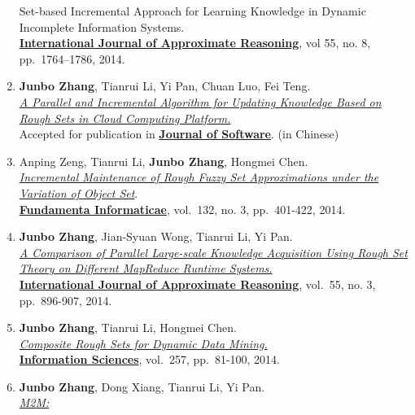 \documentclass[]{article}
\begin{document}
\begin{enumerate}
{{  Set-based Incremental Approach for Learning Knowledge in Dynamic
  Incomplete Information Systems.}}\\
  \href{http://www.journals.elsevier.com/international-journal-of-approximate-reasoning}{\textbf{International
  Journal of Approximate Reasoning}}, vol 55, no. 8, pp.~1764--1786,
  2014.
\item
  \textbf{Junbo Zhang}, Tianrui Li, Yi Pan, Chuan Luo, Fei Teng.\\
  \href{http://dx.doi.org/10.13328/j.cnki.jos.004590}{\emph{A Parallel
  and Incremental Algorithm for Updating Knowledge Based on Rough Sets
  in Cloud Computing Platform.}}\\ Accepted for publication in
  \href{http://www.jos.org.cn/ch/index.aspx}{\textbf{Journal of
  Software}}. (in Chinese)
\item
  Anping Zeng, Tianrui Li, \textbf{Junbo Zhang}, Hongmei Chen.\\
  \href{http://dx.doi.org/10.3233/FI-2014-1051}{\emph{Incremental
  Maintenance of Rough Fuzzy Set Approximations under the Variation of
  Object Set}}.\\
  \href{http://www.iospress.nl/journal/fundamenta-informaticae}{\textbf{Fundamenta
  Informaticae}}, vol.~132, no. 3, pp.~401-422, 2014.
\item
  \textbf{Junbo Zhang}, Jian-Syuan Wong, Tianrui Li, Yi Pan.\\
  \href{http://dx.doi.org/10.1016/j.ijar.2013.08.003}{\emph{A Comparison
  of Parallel Large-scale Knowledge Acquisition Using Rough Set Theory
  on Different MapReduce Runtime Systems.}}\\
  \href{http://www.journals.elsevier.com/international-journal-of-approximate-reasoning}{\textbf{International
  Journal of Approximate Reasoning}}, vol.~55, no. 3, pp.~896-907, 2014.
\item
  \textbf{Junbo Zhang}, Tianrui Li, Hongmei Chen.\\
  \href{http://dx.doi.org/10.1016/j.ins.2013.08.016}{\emph{Composite
  Rough Sets for Dynamic Data Mining.}}\\
  \href{http://www.journals.elsevier.com/information-sciences}{\textbf{Information
  Sciences}}, vol.~257, pp.~81-100, 2014.
\item
  \textbf{Junbo Zhang}, Dong Xiang, Tianrui Li, Yi Pan.\\
  \href{http://ieeexplore.ieee.org/xpl/articleDetails.jsp?tp=\&arnumber=6449402\&contentType=Journals+\%26+Magazines\&queryText\%3DM2M\%3A+A+simple+Matlab-to-MapReduce+translator+for+Cloud+Computing}{\emph{M2M:
}}
\end{enumerate}
\end{document}
